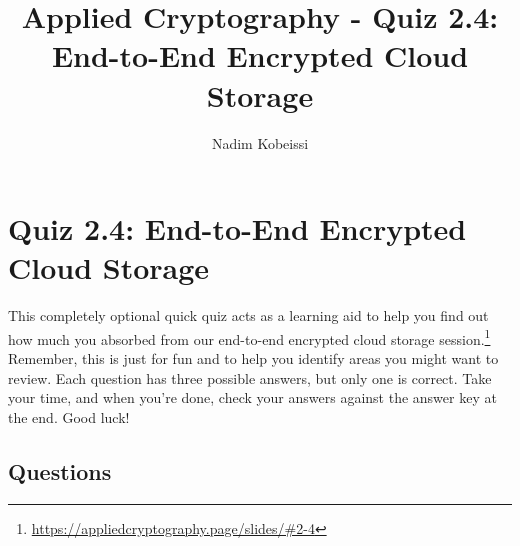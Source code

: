 \documentclass[10pt,a4paper,american]{exam}
\title{Applied Cryptography - Quiz 2.4: End-to-End Encrypted Cloud Storage}
\author{Nadim Kobeissi}
\begin{document}
\classhandoutheader
\section*{Quiz 2.4: End-to-End Encrypted Cloud Storage}

\begin{tcolorbox}[colframe=OliveGreen!30!white,colback=OliveGreen!5!white]
	This completely optional quick quiz acts as a learning aid to help you find out how much you absorbed from our end-to-end encrypted cloud storage session.\footnote{\url{https://appliedcryptography.page/slides/\#2-4}} Remember, this is just for fun and to help you identify areas you might want to review. Each question has three possible answers, but only one is correct. Take your time, and when you're done, check your answers against the answer key at the end. Good luck!
\end{tcolorbox}

\subsection*{Questions}
\end{document}
